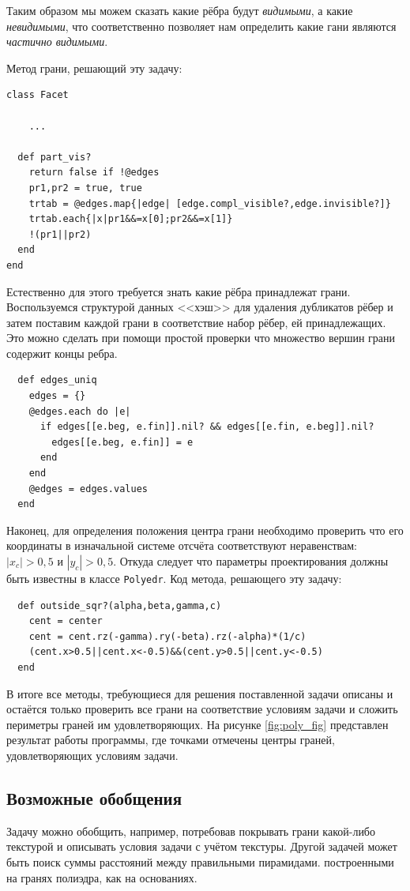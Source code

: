 Таким образом мы можем сказать какие рёбра будут \emph{видимыми}, а какие \emph{невидимыми}, что соответственно позволяет нам определить какие гани являются \emph{частично видимыми}.

Метод грани, решающий эту задачу:
\begin{lstlisting}
class Facet
    
    ...

  def part_vis?
    return false if !@edges
    pr1,pr2 = true, true
    trtab = @edges.map{|edge| [edge.compl_visible?,edge.invisible?]}
    trtab.each{|x|pr1&&=x[0];pr2&&=x[1]}
    !(pr1||pr2)
  end 
end
\end{lstlisting}

Естественно для этого требуется знать какие рёбра принадлежат грани. Воспользуемся структурой данных <<хэш>> для удаления дубликатов рёбер и затем поставим каждой грани в соответствие набор рёбер, ей принадлежащих. Это можно сделать при помощи простой проверки что множество вершин грани содержит концы ребра.
\begin{lstlisting}
  def edges_uniq
    edges = {}
    @edges.each do |e|
      if edges[[e.beg, e.fin]].nil? && edges[[e.fin, e.beg]].nil?
        edges[[e.beg, e.fin]] = e
      end
    end
    @edges = edges.values
  end
\end{lstlisting}

Наконец, для определения положения центра грани необходимо проверить что его координаты  в изначальной системе отсчёта соответствуют неравенствам:
$|x_c|>0,5$ и $|y_c|>0,5$. Откуда следует что параметры проектирования должны быть известны в классе \verb|Polyedr|. 
Код метода, решающего эту задачу:
\begin{lstlisting}
  def outside_sqr?(alpha,beta,gamma,c)
    cent = center
    cent = cent.rz(-gamma).ry(-beta).rz(-alpha)*(1/c)
    (cent.x>0.5||cent.x<-0.5)&&(cent.y>0.5||cent.y<-0.5)
  end
\end{lstlisting}

В итоге все методы, требующиеся для решения поставленной задачи описаны и остаётся только проверить все грани на соответствие условиям задачи и сложить периметры граней им удовлетворяющих.
На рисунке \ref{fig:poly_fig} представлен результат работы программы, где точками отмечены центры граней, удовлетворяющих условиям задачи.

\subsection{Возможные обобщения}
Задачу можно обобщить, например, потребовав покрывать грани какой-либо текстурой и описывать условия задачи с учётом текстуры. Другой задачей может быть поиск суммы расстояний между правильными пирамидами. построенными на гранях полиэдра, как на основаниях.


